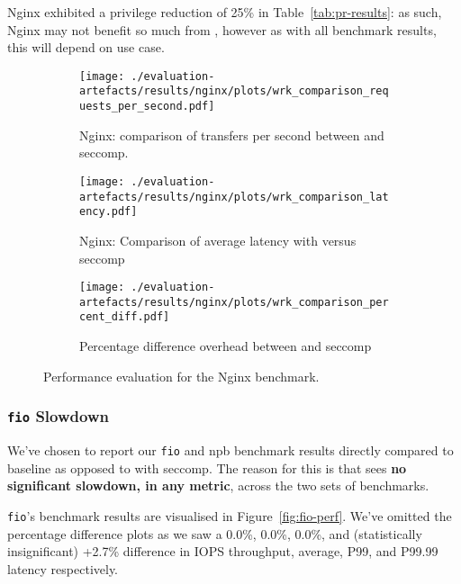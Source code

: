 Nginx exhibited a privilege reduction of 25\% in Table~\ref{tab:pr-results}: as
such, Nginx may not benefit so much from \af, however as with all benchmark
results, this will depend on use case.

\begin{figure}[htbp]
    \centering
    \begin{subfigure}[b]{0.75 \textwidth}
        \centering
        \texttt{[image: ./evaluation-artefacts/results/nginx/plots/wrk\_comparison\_requests\_per\_second.pdf]} 
        \caption{Nginx: comparison of transfers per second between \af and
        seccomp.}
        \label{fig:nginx-rps}
    \end{subfigure}
    \hfill
     \begin{subfigure}[b]{0.45 \textwidth}
        \centering
        \texttt{[image: ./evaluation-artefacts/results/nginx/plots/wrk\_comparison\_latency.pdf]} 
        \caption{Nginx: Comparison of average latency with \af versus
        seccomp}
        \label{fig:nginx-time}
    \end{subfigure}
     \medskip 
     \begin{subfigure}[b]{0.45 \textwidth}
        \centering
        \texttt{[image: ./evaluation-artefacts/results/nginx/plots/wrk\_comparison\_percent\_diff.pdf]} %
        \caption{Percentage difference overhead between \af and seccomp}
        \label{fig:nginx-percdiff}
    \end{subfigure}

    \caption{Performance evaluation for the Nginx benchmark.}
    \label{fig:nginx-perf}
\end{figure}

\subsubsection{\texttt{fio} Slowdown}\label{subsubsec:fio-slowdown}

We've chosen to report our \texttt{fio} and \ac{npb} benchmark results directly
compared to baseline as opposed to with seccomp. The reason for this is that \af
sees \textbf{no significant slowdown, in any metric}, across the two sets of
benchmarks. 

\texttt{fio}'s benchmark results are visualised in Figure~\ref{fig:fio-perf}.
We've omitted the percentage difference plots as we saw a 0.0\%, 0.0\%, 0.0\%, and
(statistically insignificant) +2.7\% difference in IOPS throughput, average,
P99, and P99.99 latency respectively. 

